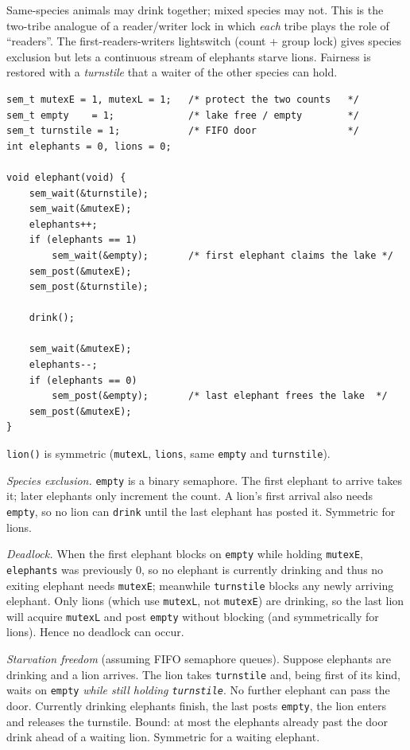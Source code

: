 \documentclass[11pt,a4paper]{article}
\newenvironment{Sol}{%
  \begin{tcolorbox}[sboxstyle, title={Solution}]%
}{%
  \end{tcolorbox}\vspace{0.35em}%
}
\begin{document}
\begin{Sol}
Same-species animals may drink together; mixed species may not. This is the
two-tribe analogue of a reader/writer lock in which \emph{each} tribe plays
the role of ``readers''. The first-readers-writers lightswitch (count +
group lock) gives species exclusion but lets a continuous stream of
elephants starve lions. Fairness is restored with a \emph{turnstile} that a
waiter of the other species can hold.

\begin{lstlisting}[numbers=none]
sem_t mutexE = 1, mutexL = 1;   /* protect the two counts   */
sem_t empty    = 1;             /* lake free / empty        */
sem_t turnstile = 1;            /* FIFO door                */
int elephants = 0, lions = 0;

void elephant(void) {
    sem_wait(&turnstile);
    sem_wait(&mutexE);
    elephants++;
    if (elephants == 1)
        sem_wait(&empty);       /* first elephant claims the lake */
    sem_post(&mutexE);
    sem_post(&turnstile);

    drink();

    sem_wait(&mutexE);
    elephants--;
    if (elephants == 0)
        sem_post(&empty);       /* last elephant frees the lake  */
    sem_post(&mutexE);
}
\end{lstlisting}
\texttt{lion()} is symmetric (\texttt{mutexL}, \texttt{lions}, same
\texttt{empty} and \texttt{turnstile}).

\emph{Species exclusion.} \texttt{empty} is a binary semaphore. The first
elephant to arrive takes it; later elephants only increment the count. A
lion's first arrival also needs \texttt{empty}, so no lion can
\texttt{drink} until the last elephant has posted it. Symmetric for lions.

\emph{Deadlock.} When the first elephant blocks on \texttt{empty} while
holding \texttt{mutexE}, \texttt{elephants} was previously 0, so no
elephant is currently drinking and thus no exiting elephant needs
\texttt{mutexE}; meanwhile \texttt{turnstile} blocks any newly arriving
elephant. Only lions (which use \texttt{mutexL}, not \texttt{mutexE})
are drinking, so the last lion will acquire \texttt{mutexL} and post
\texttt{empty} without blocking (and symmetrically for lions). Hence no
deadlock can occur.

\emph{Starvation freedom} (assuming FIFO semaphore queues). Suppose elephants
are drinking and a lion arrives. The lion takes \texttt{turnstile} and, being
first of its kind, waits on \texttt{empty} \emph{while still holding
\texttt{turnstile}}. No further elephant can pass the door. Currently
drinking elephants finish, the last posts \texttt{empty}, the lion enters
and releases the turnstile. Bound: at most the elephants already past the
door drink ahead of a waiting lion. Symmetric for a waiting elephant.
\end{Sol}
\end{document}
